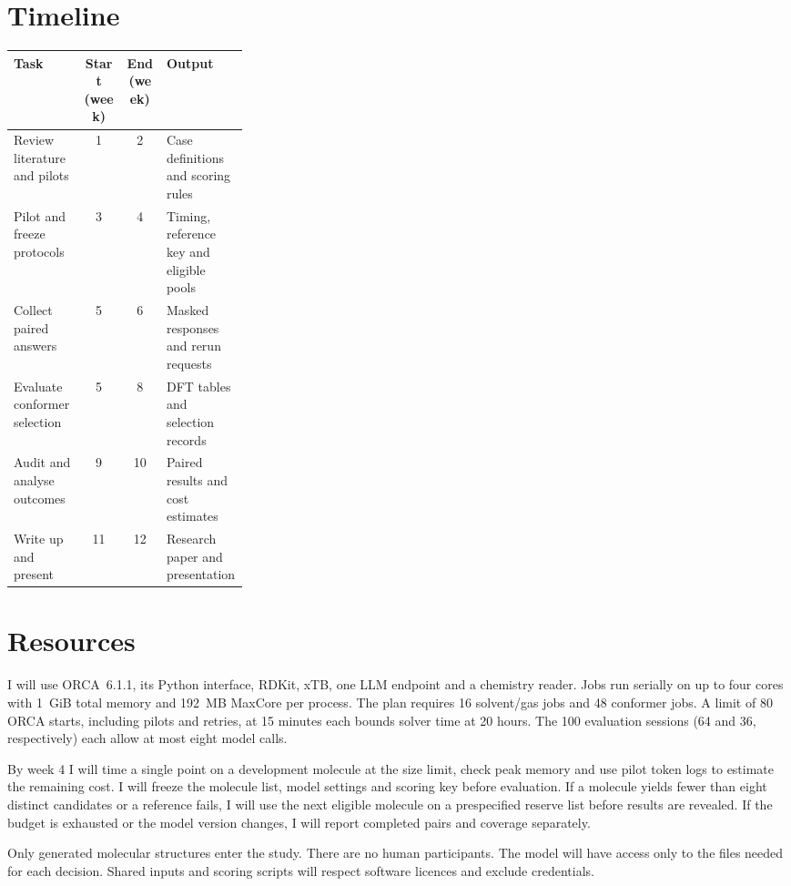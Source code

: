 \documentclass[12pt,a4paper]{article}
\begin{document}
\section{Timeline}
\begin{tabularx}{\linewidth}{|>{\raggedright\arraybackslash}p{0.30\linewidth}|c|c|Y|}
\hline
{}\textbf{Task} & \textbf{Start (week)} & \textbf{End (week)} & \textbf{Output} \\ \hline
Review literature and pilots    & 1 & 2 & Case definitions and scoring rules \\ \hline
Pilot and freeze protocols      & 3 & 4 & Timing, reference key and eligible pools \\ \hline
Collect paired answers          & 5 & 6 & Masked responses and rerun requests \\ \hline
Evaluate conformer selection    & 5 & 8 & DFT tables and selection records \\ \hline
Audit and analyse outcomes      & 9 & 10 & Paired results and cost estimates \\ \hline
Write up and present            & 11 & 12 & Research paper and presentation \\ \hline
\end{tabularx}

\section{Resources}
I will use ORCA~6.1.1, its Python interface, RDKit, xTB, one LLM endpoint
and a chemistry reader. Jobs run serially on up to four cores with 1~GiB
total memory and 192~MB MaxCore per process. The plan requires 16 solvent/gas
jobs and 48 conformer jobs. A limit of 80 ORCA starts, including pilots and
retries, at 15 minutes each bounds solver time at 20 hours. The 100 evaluation
sessions (64 and 36, respectively) each allow at most eight model calls.

By week 4 I will time a single point on a development molecule at the size
limit, check peak memory and use pilot token logs to estimate the remaining
cost. I will freeze the molecule list, model settings and scoring key before
evaluation. If a molecule yields fewer than eight distinct candidates or a
reference fails, I will use the next eligible molecule on a prespecified
reserve list before results are revealed. If the budget is exhausted or the
model version changes, I will report completed pairs and coverage separately.

Only generated molecular structures enter the study. There are no human
participants. The model will have access only to the files needed for each
decision. Shared inputs and scoring scripts will respect software licences
and exclude credentials.
\end{document}
